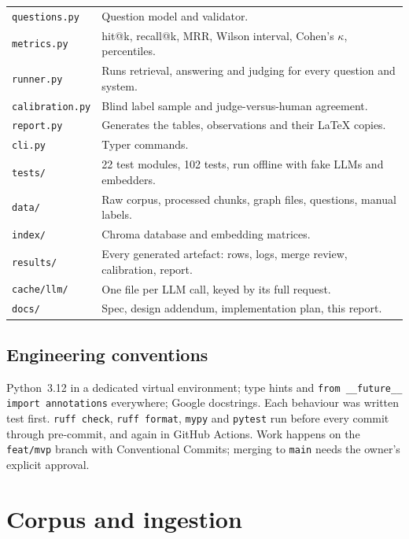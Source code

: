 \documentclass[11pt,a4paper]{article}
\newcommand{\code}[1]{\texttt{#1}}
\begin{document}
\begin{center}
\begin{tabular}{p{4.6cm}p{10.4cm}}
\code{questions.py} & Question model and validator. \\
\code{metrics.py} & hit@k, recall@k, MRR, Wilson interval, Cohen's $\kappa$, percentiles. \\
\code{runner.py} & Runs retrieval, answering and judging for every question and system. \\
\code{calibration.py} & Blind label sample and judge-versus-human agreement. \\
\code{report.py} & Generates the tables, observations and their LaTeX copies. \\
\code{cli.py} & Typer commands. \\
\code{tests/} & 22 test modules, 102 tests, run offline with fake LLMs and embedders. \\
\code{data/} & Raw corpus, processed chunks, graph files, questions, manual labels. \\
\code{index/} & Chroma database and embedding matrices. \\
\code{results/} & Every generated artefact: rows, logs, merge review, calibration, report. \\
\code{cache/llm/} & One file per LLM call, keyed by its full request. \\
\code{docs/} & Spec, design addendum, implementation plan, this report. \\
\bottomrule
\end{tabular}
\end{center}

\subsection{Engineering conventions}

Python~3.12 in a dedicated virtual environment; type hints and
\code{from \_\_future\_\_ import annotations} everywhere; Google docstrings. Each behaviour was
written test first. \code{ruff check}, \code{ruff format}, \code{mypy} and \code{pytest} run
before every commit through pre-commit, and again in GitHub Actions. Work happens on the
\code{feat/mvp} branch with Conventional Commits; merging to \code{main} needs the owner's
explicit approval.

\section{Corpus and ingestion}
\end{document}
